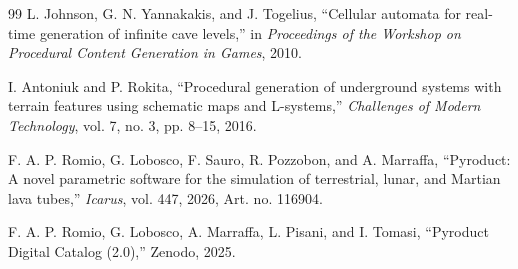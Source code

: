 \documentclass[conference]{IEEEtran}
\begin{document}
\begin{thebibliography}{99}
L. Johnson, G. N. Yannakakis, and J. Togelius,
``Cellular automata for real-time generation of infinite cave levels,''
in \emph{Proceedings of the Workshop on Procedural Content Generation in Games}, 2010.

I. Antoniuk and P. Rokita,
``Procedural generation of underground systems with terrain features using schematic maps and L-systems,''
\emph{Challenges of Modern Technology}, vol. 7, no. 3, pp. 8--15, 2016.

F. A. P. Romio, G. Lobosco, F. Sauro, R. Pozzobon, and A. Marraffa,
``Pyroduct: A novel parametric software for the simulation of terrestrial, lunar, and Martian lava tubes,''
\emph{Icarus}, vol. 447, 2026, Art. no. 116904.

F. A. P. Romio, G. Lobosco, A. Marraffa, L. Pisani, and I. Tomasi,
``Pyroduct Digital Catalog (2.0),'' Zenodo, 2025.

\end{thebibliography}
\end{document}
